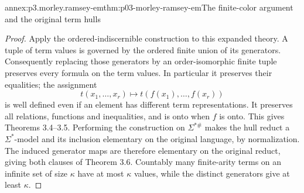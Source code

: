 \begin{annexitem}{annex:p3.morley.ramsey-em}{thm:p03-morley-ramsey-em}{The finite-color argument and the original term hulls}
\begin{proof}
Apply the ordered-indiscernible construction to this
expanded theory. A tuple of term values is governed
by the ordered finite union of its generators.
Consequently replacing those generators by an
order-isomorphic finite tuple preserves every
formula on the term values. In particular it
preserves their equalities; the assignment
\[
 t(x_1,\ldots,x_r)\longmapsto
           t(f(x_1),\ldots,f(x_r))
\]
is well defined even if an element has different
term representations. It preserves all relations,
functions and inequalities, and is onto when
\(f\) is onto. This gives Theorems 3.4--3.5.
Performing the construction on \(\Sigma^{*\#}\)
makes the hull reduct a \(\Sigma^*\)-model and its
inclusion elementary on the original language,
by normalization. The induced generator maps are
therefore elementary on the original reduct,
giving both clauses of Theorem 3.6. Countably many
finite-arity terms on an infinite set of size
\(\kappa\) have at most \(\kappa\) values, while
the distinct generators give at least \(\kappa\).
\end{proof}
\end{annexitem}


